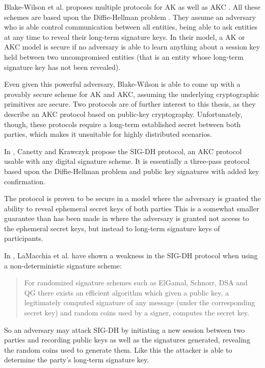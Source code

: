 Blake-Wilson et al. proposes multiple protocols for AK as well as AKC \cite{blake1997key}.
All these schemes are based upon the Diffie-Hellman problem \cite{diffie1976new}.
They assume an adversary who is able control communication between all entities, being able to ask entities at any time to reveal their long-term signature keys.
In their model, a AK or AKC model is secure if no adversary is able to learn anything about a session key held between two uncompromised entities (that is an entity whose long-term signature key has not been revealed).

Even given this powerful adversary, Blake-Wilson is able to come up with a provably secure scheme for AK and AKC, assuming the underlying cryptographic primitives are secure.
Two protocols are of further interest to this thesis, as they describe an AKC protocol based on public-key cryptography.
Unfortunately, though, these protocols require a long-term established secret between both parties, which makes it unsuitable for highly distributed scenarios.

In \cite{canetti2001analysis}, Canetty and Krawczyk propose the SIG-DH protocol, an AKC protocol usable with any digital signature scheme.
It is essentially a three-pass protocol based upon the Diffie-Hellman problem and public key signatures with added key confirmation.

The protocol is proven to be secure in a model where the adversary is granted the ability to reveal ephemeral secret keys of both parties
This is a somewhat smaller guarantee than has been made in \cite{blake1997key} where the adversary is granted not access to the ephemeral secret keys, but instead to long-term signature keys of participants.

In \cite{lamacchia2007stronger}, LaMacchia et al. have shown a weakness in the SIG-DH protocol when using a non-deterministic signature scheme:
\begin{quote}
    For randomized signature schemes such as ElGamal, Schnorr, DSA and QG there exists an efficient algorithm which given a public key, a legitimately computed signature of any message (under the corresponding secret key) and random coins used by a signer, computes the secret key.
\end{quote}
So an adversary may attack SIG-DH by initiating a new session between two parties and recording public keys as well as the signatures generated, revealing the random coins used to generate them.
Like this the attacker is able to determine the party's long-term signature key.


